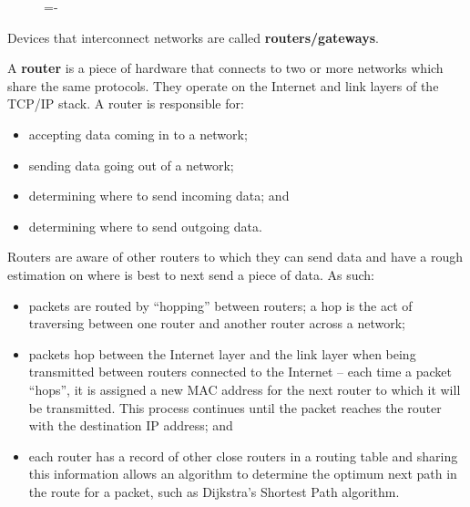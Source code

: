 \documentclass[a4paper]{systems-software}
\begin{document}
\begin{figure}[H]
	\lineskip=-\fboxrule
\end{figure}

Devices that interconnect networks are called \textbf{routers/gateways}.

A \textbf{router} is a piece of hardware that connects to two or more networks which share the same protocols. They operate on the Internet and link layers of the TCP/IP stack. A router is responsible for:
\begin{itemize}
	\item accepting data coming in to a network;
	\item sending data going out of a network;
	\item determining where to send incoming data; and
	\item determining where to send outgoing data.
\end{itemize}

Routers are aware of other routers to which they can send data and have a rough estimation on where is best to next send a piece of data. As such:
\begin{itemize}
	\item packets are routed by “hopping” between routers; a hop is the act of traversing between one router and another router across a network;
	\item packets hop between the Internet layer and the link layer when being transmitted between routers connected to the Internet -- each time a packet “hops”, it is assigned a new MAC address for the next router to which it will be transmitted. This process continues until the packet reaches the router with the destination IP address; and
	\item each router has a record of other close routers in a routing table and sharing this information allows an algorithm to determine the optimum next path in the route for a packet, such as Dijkstra’s Shortest Path algorithm.
\end{itemize}
\end{document}

